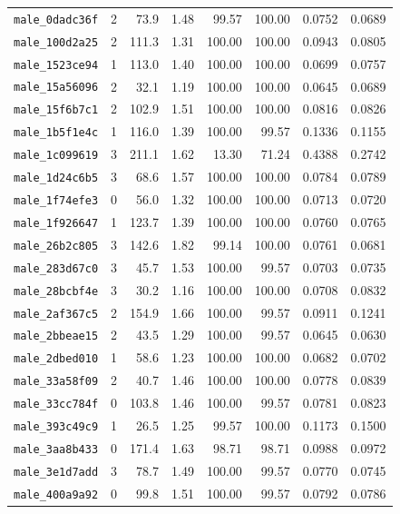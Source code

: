 \documentclass[11pt]{article}
\begin{document}
\begin{longtable}{lrrrrrrr}
\texttt{male\_0dadc36f} & 2 & 73.9 & 1.48 & 99.57 & 100.00 & 0.0752 & 0.0689 \\
\texttt{male\_100d2a25} & 2 & 111.3 & 1.31 & 100.00 & 100.00 & 0.0943 & 0.0805 \\
\texttt{male\_1523ce94} & 1 & 113.0 & 1.40 & 100.00 & 100.00 & 0.0699 & 0.0757 \\
\texttt{male\_15a56096} & 2 & 32.1 & 1.19 & 100.00 & 100.00 & 0.0645 & 0.0689 \\
\texttt{male\_15f6b7c1} & 2 & 102.9 & 1.51 & 100.00 & 100.00 & 0.0816 & 0.0826 \\
\texttt{male\_1b5f1e4c} & 1 & 116.0 & 1.39 & 100.00 & 99.57 & 0.1336 & 0.1155 \\
\texttt{male\_1c099619} & 3 & 211.1 & 1.62 & 13.30 & 71.24 & 0.4388 & 0.2742 \\
\texttt{male\_1d24c6b5} & 3 & 68.6 & 1.57 & 100.00 & 100.00 & 0.0784 & 0.0789 \\
\texttt{male\_1f74efe3} & 0 & 56.0 & 1.32 & 100.00 & 100.00 & 0.0713 & 0.0720 \\
\texttt{male\_1f926647} & 1 & 123.7 & 1.39 & 100.00 & 100.00 & 0.0760 & 0.0765 \\
\texttt{male\_26b2c805} & 3 & 142.6 & 1.82 & 99.14 & 100.00 & 0.0761 & 0.0681 \\
\texttt{male\_283d67c0} & 3 & 45.7 & 1.53 & 100.00 & 99.57 & 0.0703 & 0.0735 \\
\texttt{male\_28bcbf4e} & 3 & 30.2 & 1.16 & 100.00 & 100.00 & 0.0708 & 0.0832 \\
\texttt{male\_2af367c5} & 2 & 154.9 & 1.66 & 100.00 & 99.57 & 0.0911 & 0.1241 \\
\texttt{male\_2bbeae15} & 2 & 43.5 & 1.29 & 100.00 & 99.57 & 0.0645 & 0.0630 \\
\texttt{male\_2dbed010} & 1 & 58.6 & 1.23 & 100.00 & 100.00 & 0.0682 & 0.0702 \\
\texttt{male\_33a58f09} & 2 & 40.7 & 1.46 & 100.00 & 100.00 & 0.0778 & 0.0839 \\
\texttt{male\_33cc784f} & 0 & 103.8 & 1.46 & 100.00 & 99.57 & 0.0781 & 0.0823 \\
\texttt{male\_393c49c9} & 1 & 26.5 & 1.25 & 99.57 & 100.00 & 0.1173 & 0.1500 \\
\texttt{male\_3aa8b433} & 0 & 171.4 & 1.63 & 98.71 & 98.71 & 0.0988 & 0.0972 \\
\texttt{male\_3e1d7add} & 3 & 78.7 & 1.49 & 100.00 & 99.57 & 0.0770 & 0.0745 \\
\texttt{male\_400a9a92} & 0 & 99.8 & 1.51 & 100.00 & 99.57 & 0.0792 & 0.0786 \\

\end{longtable}
\end{document}
